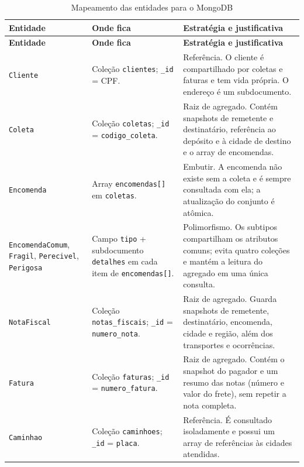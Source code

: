 {\small
\begin{longtable}{@{}L{2.6cm}L{4.4cm}L{8.4cm}@{}}
\caption{Mapeamento das entidades para o MongoDB}
\label{tab:nosql_entidades}\\
\toprule
\textbf{Entidade} & \textbf{Onde fica} & \textbf{Estratégia e justificativa}\\
\midrule
\endfirsthead
\toprule
\textbf{Entidade} & \textbf{Onde fica} & \textbf{Estratégia e justificativa}\\
\midrule
\endhead
\bottomrule
\endfoot

\texttt{Cliente} & Coleção \texttt{clientes}; \texttt{\_id} = CPF. & Referência. O cliente é compartilhado por coletas e faturas e tem vida própria. O endereço é um subdocumento.\\

\texttt{Coleta} & Coleção \texttt{coletas}; \texttt{\_id} = \texttt{codigo\_coleta}. & Raiz de agregado. Contém snapshots de remetente e destinatário, referência ao depósito e à cidade de destino e o array de encomendas.\\

\texttt{Encomenda} & Array \texttt{encomendas[]} em \texttt{coletas}. & Embutir. A encomenda não existe sem a coleta e é sempre consultada com ela; a atualização do conjunto é atômica.\\

\texttt{Encomenda\-Comum}, \texttt{Fragil}, \texttt{Perecivel}, \texttt{Perigosa} & Campo \texttt{tipo} + subdocumento \texttt{detalhes} em cada item de \texttt{encomendas[]}. & Polimorfismo. Os subtipos compartilham os atributos comuns; evita quatro coleções e mantém a leitura do agregado em uma única consulta.\\

\texttt{NotaFiscal} & Coleção \texttt{notas\_fiscais}; \texttt{\_id} = \texttt{numero\_nota}. & Raiz de agregado. Guarda snapshots de remetente, destinatário, encomenda, cidade e região, além dos transportes e ocorrências.\\

\texttt{Fatura} & Coleção \texttt{faturas}; \texttt{\_id} = \texttt{numero\_fatura}. & Raiz de agregado. Contém o snapshot do pagador e um resumo das notas (número e valor do frete), sem repetir a nota completa.\\

\texttt{Caminhao} & Coleção \texttt{caminhoes}; \texttt{\_id} = \texttt{placa}. & Referência. É consultado isoladamente e possui um array de referências às cidades atendidas.\\


\end{longtable}}

